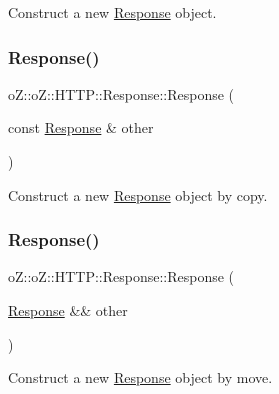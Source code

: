 Construct a new \mbox{\hyperlink{classo_z_1_1o_z_1_1_h_t_t_p_1_1_response}{Response}} object. 

\mbox{\label{classo_z_1_1o_z_1_1_h_t_t_p_1_1_response_a0a0c84d1d4e5aa1574e18d84f5daba4e}} 
\subsubsection{\texorpdfstring{Response()}{Response()}\hspace{0.1cm}{\footnotesize\ttfamily [2/3]}}
{\footnotesize\ttfamily o\+Z\+::o\+Z\+::\+H\+T\+T\+P\+::\+Response\+::\+Response (\begin{DoxyParamCaption}\item[{const \mbox{\hyperlink{classo_z_1_1o_z_1_1_h_t_t_p_1_1_response}{Response}} \&}]{other }\end{DoxyParamCaption})\hspace{0.3cm}{\ttfamily [default]}}



Construct a new \mbox{\hyperlink{classo_z_1_1o_z_1_1_h_t_t_p_1_1_response}{Response}} object by copy. 

\mbox{\label{classo_z_1_1o_z_1_1_h_t_t_p_1_1_response_afc44351c01bb3eca89add0bd80ae4995}} 
\subsubsection{\texorpdfstring{Response()}{Response()}\hspace{0.1cm}{\footnotesize\ttfamily [3/3]}}
{\footnotesize\ttfamily o\+Z\+::o\+Z\+::\+H\+T\+T\+P\+::\+Response\+::\+Response (\begin{DoxyParamCaption}\item[{\mbox{\hyperlink{classo_z_1_1o_z_1_1_h_t_t_p_1_1_response}{Response}} \&\&}]{other }\end{DoxyParamCaption})\hspace{0.3cm}{\ttfamily [default]}}



Construct a new \mbox{\hyperlink{classo_z_1_1o_z_1_1_h_t_t_p_1_1_response}{Response}} object by move. 

